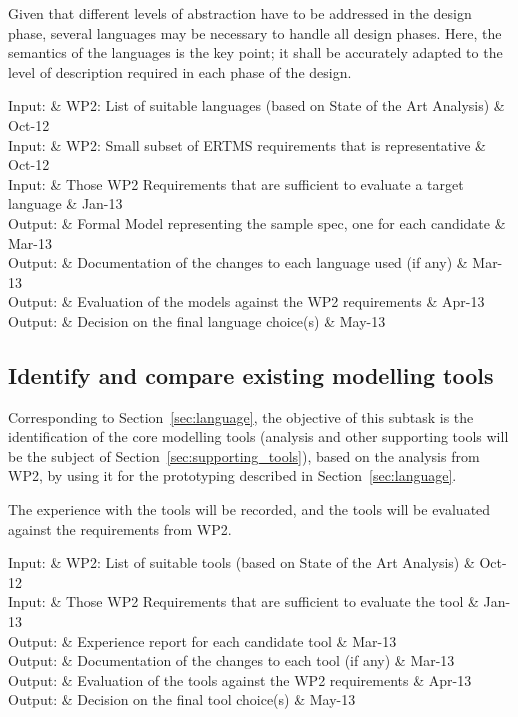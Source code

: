 \documentclass{template/openetcs_article}
\begin{document}
Given that different levels of abstraction have to be addressed in the
design phase, several languages may be necessary to handle all design
phases. Here, the semantics of the languages is the key point; it
shall be accurately adapted to the level of description required in
each phase of the design.

\begin{inoutput}
Input: & WP2: List of suitable languages (based on State of the Art Analysis) & Oct-12 \\
Input: & WP2: Small subset of ERTMS requirements that is representative & Oct-12 \\
Input: & Those WP2 Requirements that are sufficient to evaluate a target language & Jan-13 \\
\hline
Output: & Formal Model representing the sample spec, one for each candidate & Mar-13 \\
Output: & Documentation of the changes to each language used (if any) & Mar-13 \\
Output: & Evaluation of the models against the WP2 requirements & Apr-13 \\
Output: & Decision on the final language choice(s) & May-13 \\
\end{inoutput}



\subsection{Identify and compare existing modelling tools}
\label{sec:tool}

Corresponding to Section~\ref{sec:language}, the objective of this
subtask is the identification of the core modelling tools 
(analysis and other supporting tools will be the subject of 
Section~\ref{sec:supporting_tools}), 
based on the
analysis from WP2, by using it for the prototyping described in
Section~\ref{sec:language}. 

The experience with the tools will be recorded, and the tools will be
evaluated against the requirements from WP2.

\begin{inoutput}
Input: & WP2: List of suitable tools (based on State of the Art Analysis) & Oct-12 \\
Input: & Those WP2 Requirements that are sufficient to evaluate the tool & Jan-13 \\
\hline
Output: & Experience report for each candidate tool & Mar-13 \\
Output: & Documentation of the changes to each tool (if any) & Mar-13 \\
Output: & Evaluation of the tools against the WP2 requirements & Apr-13 \\
Output: & Decision on the final tool choice(s) & May-13 \\
\end{inoutput}
\end{document}

